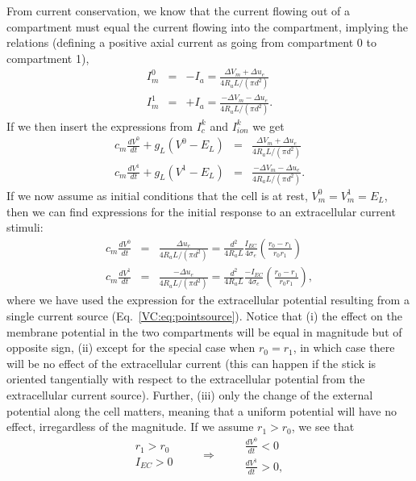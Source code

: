  
From current conservation, we know that the current flowing out of a compartment must equal the current flowing into the compartment, implying the relations (defining a positive axial current as going from compartment 0 to compartment 1),
\begin{eqnarray}
I_m^0 &=& - I_a = \frac{\Delta V_m + \Delta u_e}{4 R_a L / (\pi d^2)} \\
I_m^1 &=& + I_a =  \frac{-\Delta V_m - \Delta u_e}{4 R_a L / (\pi d^2)}.
\end{eqnarray}
If we then insert the expressions from $I^k_c$ and $I^k_{ion}$ we get
\begin{eqnarray}
c_m\frac{dV^0}{dt} + g_L (V^0 - E_L) &=& \frac{\Delta V_m + \Delta u_e}{4 R_a L / (\pi d^2)} \\
c_m\frac{dV^1}{dt} + g_L (V^1 - E_L) &=& \frac{-\Delta V_m - \Delta u_e}{4 R_a L / (\pi d^2)}.
\label{Stim:eq:two-comp-stim}
\end{eqnarray}
If we now assume as initial conditions that the cell is at rest, $V_m^0 = V_m^1 = E_L$, then we can find expressions for the initial response to an extracellular current stimuli:
\begin{eqnarray}
\label{Stim:eq:initial_response}
c_m\frac{dV^0}{dt} &=& \frac{\Delta u_e}{4 R_a L / (\pi d^2)} =  \frac{d^2}{4 R_a L} \frac{I_{EC}}{4\sigma_e} \left(\frac{r_0 - r_1}{r_0 r_1} \right) \\
c_m\frac{dV^1}{dt} &=& \frac{- \Delta u_e}{4 R_a L / (\pi d^2)} =  \frac{d^2}{4 R_a L} \frac{-I_{EC}}{4 \sigma_e} \left(\frac{r_0 - r_1}{r_0 r_1} \right),
\end{eqnarray}
where we have used the expression for the extracellular potential resulting from a single current source (Eq.~\ref{VC:eq:pointsource}).
Notice that (i) the effect on the membrane potential in the two compartments will be equal in magnitude but of opposite sign, (ii) except for the special case when $r_0=r_1$, in which case there will be no effect of the extracellular current (this can happen if the stick is oriented tangentially with respect to the extracellular potential from the extracellular current source). Further, (iii) only the change of the external potential along the cell matters, meaning that a uniform potential will have no effect, irregardless of the magnitude. 
If we assume $r_1 > r_0$, we see that
\begin{equation}
 \begin{aligned}
        r_1>r_0\\
        I_{EC} > 0
       \end{aligned}
 \qquad \Rightarrow \qquad
 \begin{aligned}
        \frac{dV^0}{dt}<0\\
        \frac{dV^1}{dt}>0,
     \end{aligned}
\end{equation}
